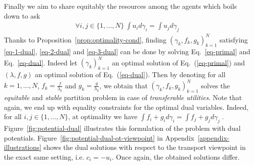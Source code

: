 Finally we aim to share equitably the resources among the agents which boils down to ask 
\begin{align}
    \label{eq-3-dual}
    \forall i,j\in\{1,...,N\}~\int u_i d\gamma_i=\int u_j d\gamma_j
\end{align}
Thanks to Proposition~\ref{prop:optimality-cond}, finding  $(\gamma_k,f_k,g_k)_{k=1}^N$ satisfying \eqref{eq-1-dual}, \eqref{eq-2-dual} and \eqref{eq-3-dual} can be done by solving Eq.~\eqref{eq-primal} and Eq.~\eqref{eq-dual}. Indeed let $(\gamma_k)_{k=1}^N$ an optimal solution of Eq.~(\ref{eq-primal}) and $(\lambda,f,g)$ an optimal solution of Eq.~(\ref{eq-dual}). Then by denoting for all $k=1,\dots,N$, 
   $f_k = \frac{f}{\lambda_k}$ and $g_k = \frac{g}{\lambda_k}$,
we obtain that $(\gamma_k,f_k,g_k)_{k=1}^N$ solves the \emph{equitable} and \emph{stable} partition problem in case of \emph{transferable utilities}. Note that again, we end up with equality constraints for the optimal dual variables. Indeed, for all $i,j\in\{1,\dots,N\}$, at optimality we have 
$\int f_i + g_i d\gamma_i = \int f_j + g_j d\gamma_j  \; $. Figure~\ref{fig:potential-dual} illustrates this formulation of the problem with dual potentials. Figure~\ref{fig:potential-dual-ot-viewpoint} in Appendix~\ref{appendix-illustrations} shows the dual solutions with respect to the transport viewpoint in the exact same setting, i.e. $c_i = - u_i$. Once again, the obtained solutions differ.





